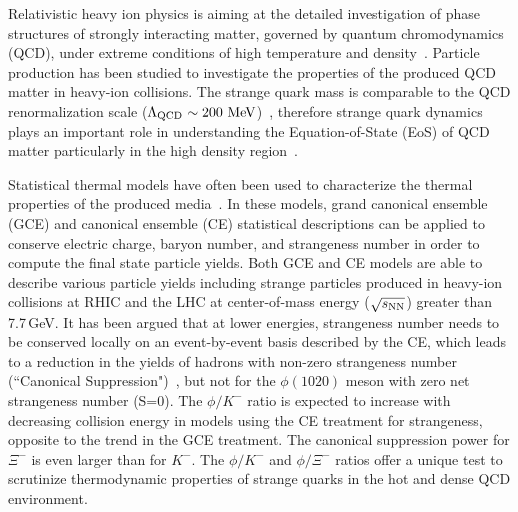 \documentclass[%
 reprint,	
showpacs,
 amsmath,amssymb,
 aps,
 superscriptaddress,
]{revtex4-1}
\begin{document}
\maketitle


Relativistic heavy ion physics is aiming at the detailed investigation of phase structures of strongly interacting matter, governed by quantum chromodynamics (QCD), under extreme conditions of high temperature and density~\cite{akiba2015hot,Busza_ARNPS,StarWhitePaper}. Particle production has been studied to investigate the properties of the produced QCD matter in heavy-ion collisions. The strange quark mass is comparable to the QCD renormalization scale ($\Lambda_{\rm{QCD}}$\,$\sim\textup{200 MeV}$)~\cite{Rafelski:1982pu,Koch:1986ud}, 
therefore strange quark dynamics plays an important role in understanding the Equation-of-State (EoS) of QCD matter particularly in the high density region~\cite{KO_sQM17,Danielewicz1592,Tetyana_ICNN,KO.PhysRevLett.55.2661,Ks0_Lambda_HADES,CASSING.openCharm.2001753}. 

Statistical thermal models have often been used to characterize the thermal properties of the produced media~\cite{Andronic_2018Naure,Rafelski_1980279,Cleymans:1992zc,Becattini:1997ii,Florkowski:2001fp,Redlich_CE,Rafelski_PRC}. In these models, grand canonical ensemble (GCE) and canonical ensemble (CE) statistical descriptions can be applied to conserve electric charge, baryon number, and strangeness number in order to compute the final state particle yields. Both GCE and CE models are able to describe various particle yields including strange particles produced in heavy-ion collisions at RHIC and the LHC at center-of-mass energy ($\sqrt{s_{\rm NN}}$) greater than 7.7\,GeV. It has been argued that at lower energies, strangeness number needs to be conserved locally on an event-by-event basis described by the CE, which leads to a reduction in the yields of hadrons with non-zero strangeness number (``Canonical Suppression")~\cite{Rafelski_1980279,Redlich:2001kb}, but not for the $\phi(1020)$ meson with zero net strangeness number (S=0). The $\phi/K^-$ ratio is expected to increase with decreasing collision energy in models using the CE treatment for strangeness, opposite to the trend in the GCE treatment. The canonical suppression power for $\Xi^-$ is even larger than for $K^-$. The $\phi/K^-$ and $\phi/\Xi^-$ ratios offer a unique test to scrutinize thermodynamic properties of strange quarks in the hot and dense QCD environment.
\end{document}
